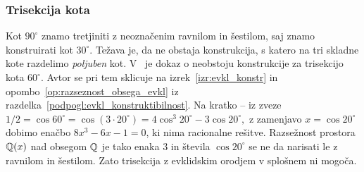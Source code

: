 \subsubsection{Trisekcija kota}
\label{podpogl:trisekcija}

Kot $90^\circ$ znamo tretjiniti z neoznačenim ravnilom in šestilom, saj znamo konstruirati kot $30^\circ$. Težava je, da ne obstaja konstrukcija, s katero na tri skladne kote razdelimo \emph{poljuben} kot. V~\cite[str.\ 77--78]{jerman1998} je dokaz o neobstoju konstrukcije za trisekcijo kota $60^\circ$. Avtor se pri tem sklicuje na izrek~\ref{izr:evkl_konstr} in opombo~\ref{op:razseznost_obsega_evkl} iz razdelka~\ref{podpogl:evkl_konstruktibilnost}. Na kratko -- iz zveze $ 1/2 = \cos 60^\circ = \cos(3 \cdot 20^\circ) = 4 \cos^3 20^\circ - 3 \cos 20^\circ, $ z zamenjavo $x = \cos 20^\circ$ dobimo enačbo $8 x^3 - 6x - 1 = 0$, ki nima racionalne rešitve. Razsežnost prostora $\mathbb Q(x)$ nad obsegom $\mathbb Q$ je tako enaka $3$ in števila $ \cos 20^\circ $ se ne da narisati le z ravnilom in šestilom. Zato trisekcija z evklidskim orodjem v splošnem ni mogoča.





